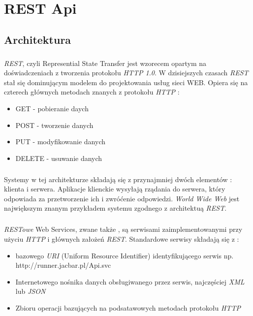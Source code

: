 \chapter{REST Api} %
\label{cha:rest_api}
\section{Architektura} %
\label{sec:architektura}
\paragraph{} %
\label{par:}
\textit{REST}, czyli Represential State Transfer jest wzorecem opartym na doświadczeniach z tworzenia protokołu \textit{HTTP 1.0}. W dzisiejszych czasach \textit{REST} stał się dominującym modelem do projektowania usług sieci WEB. Opiera się na czterech głównych metodach znanych z protokołu \textit{HTTP} : 

\begin{itemize}
	\item GET - pobieranie daych
	\item POST - tworzenie danych
	\item PUT - modyfikowanie danych
	\item DELETE - usuwanie danych
\end{itemize}

\paragraph{} %
\label{par:}
Systemy w tej architekturze składają się z przynajmniej dwóch elementów : klienta i serwera. Aplikacje klienckie wysyłają rządania do serwera, który odpowiada za przetworzenie ich i zwróćenie odpowiedzi.
\textit{World Wide Web} jest największym znanym przykładem systemu zgodnego z architektuą \textit{REST}.

\paragraph{} %
\label{par:}
\textit{RESTowe} Web Services, zwane także , są serwisami zaimplementowanymi przy użyciu \textit{HTTP} i głównych założeń \textit{REST}. Standardowe serwisy składają się z :
\begin{itemize}
	\item bazowego \textit{URI} (Uniform Resource Identifier) identyfikującego serwis np. http://runner.jacbar.pl/Api.svc
	\item Internetowego nośnika danych obsługiwanego przez serwis, najczęściej \textit{XML} lub \textit{JSON}
	\item Zbioru operacji bazujących na podsatawowych metodach protokołu \textit{HTTP}
\end{itemize}


